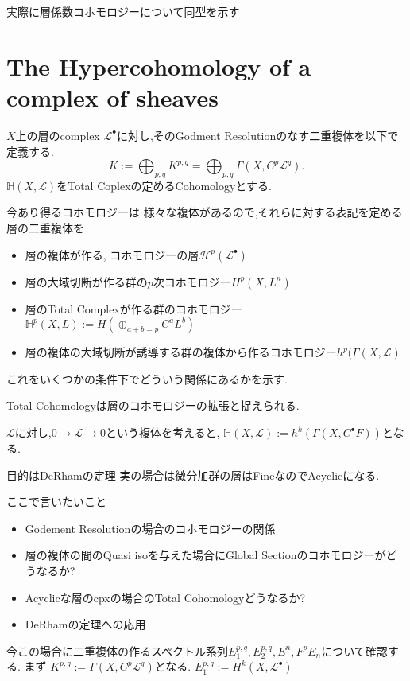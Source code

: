 実際に層係数コホモロジーについて同型を示す

\section{The Hypercohomology of a complex of sheaves}
$X$上の層のcomplex $\mathcal{L}^{\bullet}$に対し,そのGodment Resolutionのなす二重複体を以下で定義する.
\begin{equation*}
K := \bigoplus_{p,q} K^{p,q} = \bigoplus_{p,q} \Gamma(X, C^p \mathcal{L}^q).
\end{equation*}
$\mathbb{H}(X, \mathcal{L})$をTotal Coplexの定めるCohomologyとする.

今あり得るコホモロジーは
様々な複体があるので,それらに対する表記を定める
層の二重複体を
\begin{itemize}
    \item 層の複体が作る, コホモロジーの層$\mathcal{H}^p(\mathcal{L}^{\bullet})$
    \item 層の大域切断が作る群の$p$次コホモロジー$H^p(X,L^n)$
    \item 層のTotal Complexが作る群のコホモロジー$\mathbb{H}^p(X,L):= H(\oplus_{a+b=p} C^{a}L^{b})$
    \item 層の複体の大域切断が誘導する群の複体から作るコホモロジー$h^p(\Gamma(X, \mathcal{L})$
\end{itemize}
これをいくつかの条件下でどういう関係にあるかを示す.


Total Cohomologyは層のコホモロジーの拡張と捉えられる.

$\mathcal{L}$に対し,$0 \to \mathcal{L} \to 0$という複体を考えると,
$\mathbb{H}(X, \mathcal{L}):= h^k(\Gamma(X, C^{\bullet} F))$となる.

目的はDeRhamの定理
実の場合は微分加群の層はFineなのでAcyclicになる.

ここで言いたいこと
\begin{itemize}
  \item Godement Resolutionの場合のコホモロジーの関係
  \item 層の複体の間のQuasi isoを与えた場合にGlobal Sectionのコホモロジーがどうなるか?
  \item Acyclicな層のcpxの場合のTotal Cohomologyどうなるか?
  \item DeRhamの定理への応用
\end{itemize}


今この場合に二重複体の作るスペクトル系列$E^{p,q}_1, E^{p,q}_2, E^{n}, F^pE_n$について確認する.
まず
$K^{p,q}:=\Gamma(X, C^p \mathcal{L}^q)$となる.
$E^{p,q}_1:= H^k(X, \mathcal{L}^{\bullet})$


